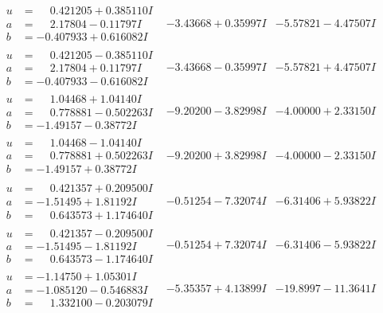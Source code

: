 \documentclass[1p]{elsarticle_modified}
\theoremstyle{definition}
\begin{document}
$$\begin{array}{c|c|c}
\begin{aligned}
u &= \phantom{-}0.421205 + 0.385110 I \\
a &= \phantom{-}2.17804 - 0.11797 I \\
b &= -0.407933 + 0.616082 I\end{aligned}
 & -3.43668 + 0.35997 I & -5.57821 - 4.47507 I \\ \hline\begin{aligned}
u &= \phantom{-}0.421205 - 0.385110 I \\
a &= \phantom{-}2.17804 + 0.11797 I \\
b &= -0.407933 - 0.616082 I\end{aligned}
 & -3.43668 - 0.35997 I & -5.57821 + 4.47507 I \\ \hline\begin{aligned}
u &= \phantom{-}1.04468 + 1.04140 I \\
a &= \phantom{-}0.778881 - 0.502263 I \\
b &= -1.49157 - 0.38772 I\end{aligned}
 & -9.20200 - 3.82998 I & -4.00000 + 2.33150 I \\ \hline\begin{aligned}
u &= \phantom{-}1.04468 - 1.04140 I \\
a &= \phantom{-}0.778881 + 0.502263 I \\
b &= -1.49157 + 0.38772 I\end{aligned}
 & -9.20200 + 3.82998 I & -4.00000 - 2.33150 I \\ \hline\begin{aligned}
u &= \phantom{-}0.421357 + 0.209500 I \\
a &= -1.51495 + 1.81192 I \\
b &= \phantom{-}0.643573 + 1.174640 I\end{aligned}
 & -0.51254 - 7.32074 I & -6.31406 + 5.93822 I \\ \hline\begin{aligned}
u &= \phantom{-}0.421357 - 0.209500 I \\
a &= -1.51495 - 1.81192 I \\
b &= \phantom{-}0.643573 - 1.174640 I\end{aligned}
 & -0.51254 + 7.32074 I & -6.31406 - 5.93822 I \\ \hline\begin{aligned}
u &= -1.14750 + 1.05301 I \\
a &= -1.085120 - 0.546883 I \\
b &= \phantom{-}1.332100 - 0.203079 I\end{aligned}
 & -5.35357 + 4.13899 I & -19.8997 - 11.3641 I \\ \hline\begin{aligned}

\end{aligned}
\end{array}$$
\end{document}

